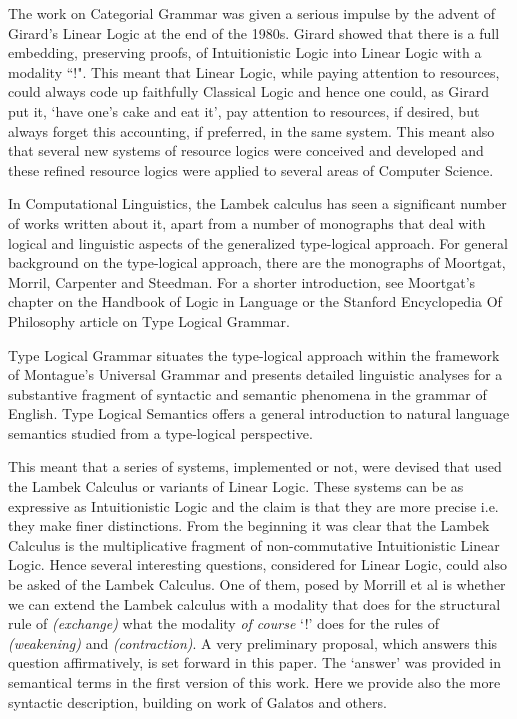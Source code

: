 \documentclass{article}
\begin{document}
The work on Categorial Grammar was given a serious impulse by the
advent of Girard's Linear Logic at the end of the 1980s.  Girard
showed that there is a full embedding, preserving proofs, of
Intuitionistic Logic into Linear Logic with a modality ``!". This
meant that Linear Logic, while paying attention to resources, could
always code up faithfully Classical Logic and hence one could, as
Girard put it, `have one's cake and eat it', pay attention to
resources, if desired, but always forget this accounting, if
preferred, in the same system. This meant also that several new
systems of resource logics were conceived and developed and these
refined resource logics were applied to several areas of Computer
Science.

In Computational Linguistics, the Lambek calculus 
has seen a significant number of works written
about it,  apart from a number of monographs that deal with
logical and linguistic aspects of the generalized type-logical
approach.  For general background on the type-logical approach, there
are the monographs of Moortgat, Morril,
Carpenter and Steedman. For a shorter introduction, see
Moortgat's chapter on the Handbook of Logic in Language \cite{?} 
or the Stanford Encyclopedia Of Philosophy article on Type Logical Grammar.

Type Logical Grammar situates the type-logical approach within the
framework of Montague's Universal Grammar and presents detailed
linguistic analyses for a substantive fragment of syntactic and
semantic phenomena in the grammar of English.  Type Logical Semantics
offers a general introduction to natural language semantics studied
from a type-logical perspective.



This meant that a series of systems, implemented or not, were devised
that used the Lambek Calculus or variants of Linear Logic. These
systems can be as expressive as Intuitionistic Logic and the claim is
that they are more precise i.e. they make finer distinctions.  From
the beginning it was clear that the Lambek Calculus is the
multiplicative fragment of non-commutative Intuitionistic Linear
Logic.  Hence several interesting questions, considered for Linear
Logic, could also be asked of the Lambek Calculus.  One of them, posed
by Morrill et al is whether we can extend the Lambek calculus with a
modality that does for the structural rule of \textit{(exchange)} what
the modality \textit{of course} `!' does for the rules of
\textit{(weakening)} and \textit{(contraction)}.  A very preliminary
proposal, which answers this question affirmatively, is set forward in
this paper. The `answer' was provided in semantical terms in the first
version of this work. Here we provide also the more syntactic
description, building on work of Galatos and others.
\end{document}
